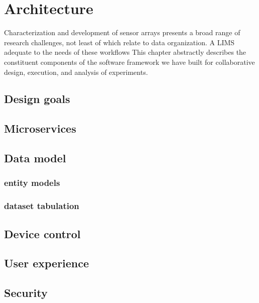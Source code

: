 \documentclass[../thesis]{subfiles}
\begin{document}
\chapter{Architecture}

Characterization and development of sensor arrays presents a broad
range of research challenges, not least of which relate to data
organization. A LIMS adequate to the needs of these workflows
This chapter abstractly describes the constituent components
of the software framework we have built for collaborative design,
execution, and analysis of experiments.

\section{Design goals}




\section{Microservices}



\section{Data model}

\subsection{entity models}
\subsection{dataset tabulation}



\section{Device control}



\section{User experience}



\section{Security}
\end{document}
